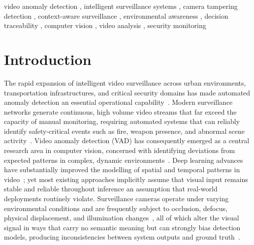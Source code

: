 \documentclass[a4paper,fleqn]{cas-dc}
\begin{document}
\begin{keywords}
  video anomaly detection \sep
  intelligent surveillance systems \sep
  camera tampering detection \sep
  context-aware surveillance \sep
  environmental awareness \sep
  decision traceability \sep
  computer vision \sep
  video analysis \sep
  security monitoring
\end{keywords}

\maketitle
{}

\FloatBarrier
\section{Introduction}
 
\begin{sloppypar}
The rapid expansion of intelligent video surveillance across urban environments, transportation infrastructures, and critical security domains has made automated anomaly detection an essential operational capability~\citep{duong2023deep,yuan2024surveillance}. Modern surveillance networks generate continuous, high volume video streams that far exceed the capacity of manual monitoring, requiring automated systems that can reliably identify safety-critical events such as fire, weapon presence, and abnormal scene activity~\citep{jebur2025scalable,ramachandra2020survey}. Video anomaly detection (VAD) has consequently emerged as a central research area in computer vision, concerned with identifying deviations from expected patterns in complex, dynamic environments~\citep{hasan2016anomaly,liu2023video}. Deep learning advances have substantially improved the modelling of spatial and temporal patterns in video~\citep{georgescu2021anomaly,park2023memory,park2020learning,cai2021appearance}; yet most existing approaches implicitly assume that visual input remains stable and reliable throughout inference an assumption that real-world deployments routinely violate. Surveillance cameras operate under varying environmental conditions and are frequently subject to occlusion, defocus, physical displacement, and illumination changes~\citep{diwan2024systematic,tyagi2023detailed}, all of which alter the visual signal in ways that carry no semantic meaning but can strongly bias detection models, producing inconsistencies between system outputs and ground truth~\citep{goswami2023hybrid}.
\end{sloppypar}
 
\end{document}
